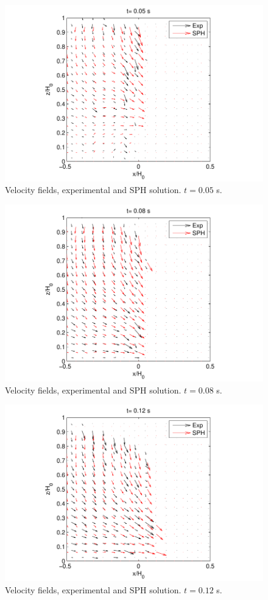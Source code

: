 %
\begin{figure}[ht!]
	\centering
	\includegraphics[width=0.70\linewidth]{Figures/5.Chapter/comp_6}
	\caption{Velocity fields, experimental and \ac{SPH} solution. $t=0.05$ s.}
	\label{fig:comp_6} 
\end{figure}
%

%
\begin{figure}[ht!]
	\centering
	\includegraphics[width=0.70\linewidth]{Figures/5.Chapter/comp_9}
	\caption{Velocity fields, experimental and \ac{SPH} solution. $t=0.08$ s.}
	\label{fig:comp_9} 
\end{figure}
%

%
\begin{figure}[ht!]
	\centering
	\includegraphics[width=0.70\linewidth]{Figures/5.Chapter/comp_13}
	\caption{Velocity fields, experimental and \ac{SPH} solution. $t=0.12$ s.}
	\label{fig:comp_13} 
\end{figure}
%

